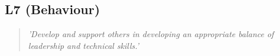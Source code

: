 \subsection*{L7 (Behaviour)}

  \begin{quote}
    \textit{'Develop and support others in
    developing an appropriate balance of leadership and
    technical skills.'}
  \end{quote}

\newpage